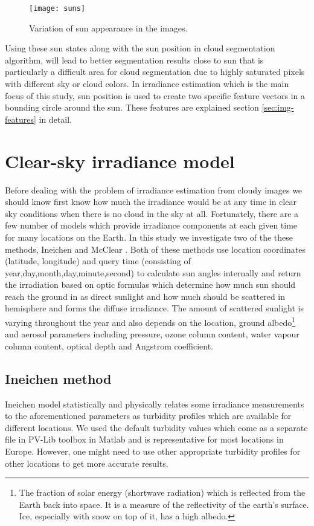 \begin{figure}[h]
\caption{Variation of sun appearance in the images.}
\label{fig:sun_variation}
\texttt{[image: suns]}
\centering
\end{figure}

Using these sun states along with the sun position in cloud segmentation algorithm, will lead to better segmentation results close to sun that is particularly a difficult area for cloud segmentation due to highly saturated pixels with different sky or cloud colors. In irradiance estimation which is the main focus of this study, sun position is used to create two specific feature vectors in a bounding circle around the sun. These features are explained section \ref{sec:img-features} in detail.

\section{Clear-sky irradiance model}
Before dealing with the problem of irradiance estimation from cloudy images we should know first know how much the irradiance would be at any time in clear sky conditions when there is no cloud in the sky at all. Fortunately, there are a few number of models which provide irradiance components at each given time for many locations on the Earth. In this study we investigate two of the these methods, Ineichen \cite{clear_sky_model} and McClear \cite{mcclear_alg}. Both of these methods use location coordinates (latitude, longitude) and query time (consisting of year,day,month,day,minute,second) to calculate sun angles internally and return the irradiation based on optic formulas which determine how much sun should reach the ground in as direct sunlight and how much should be scattered in hemisphere and forms the diffuse irradiance. The amount of scattered sunlight is varying throughout the year and also depends on the location, ground albedo\footnote{The fraction of solar energy (shortwave radiation) which is reflected from the Earth back into space. It is a measure of the reflectivity of the earth's surface. Ice, especially with snow on top of it, has a high albedo.} and aerosol parameters including pressure, ozone column content, water vapour column content, optical depth and Angstrom coefficient. 

\subsection{Ineichen method}
Ineichen model statistically and physically relates some irradiance measurements to the aforementioned parameters as turbidity profiles which are available for different locations. We used the default turbidity values which come as a separate file in PV-Lib toolbox \cite{pv_lib_toolbox} in Matlab and is representative for most locations in Europe. However, one might need to use other appropriate turbidity profiles for other locations to get more accurate results.
